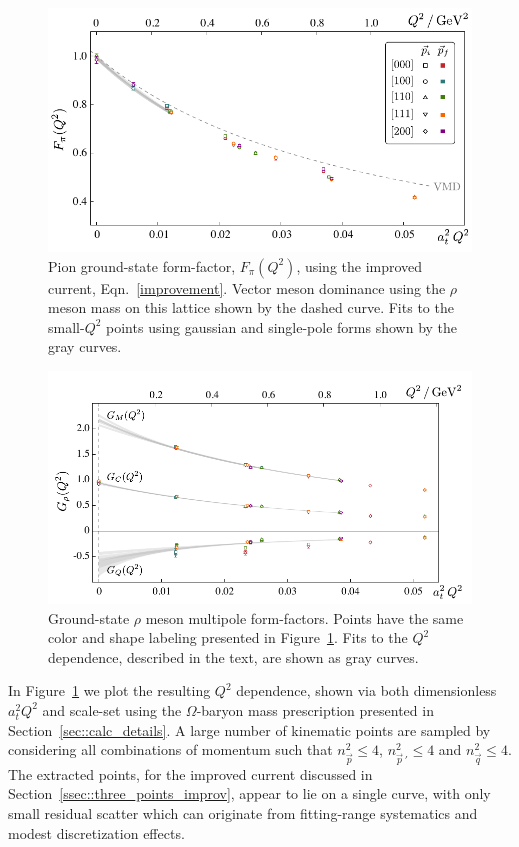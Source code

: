\documentclass[twocolumn,amsmath,amssymb,prd,10pt,floatfix, 
superscriptaddress,nofootinbib, showpacs, preprintnumbers]{revtex4-1}
\begin{document}
\begin{figure}
  \includegraphics[width=0.84\linewidth]{fig13.pdf}
  \caption{ Pion ground-state form-factor, $F_\pi(Q^2)$, using the improved current, Eqn.~\ref{improvement}. Vector meson dominance using the $\rho$ meson mass on this lattice shown by the dashed curve. Fits to the small-$Q^2$ points using gaussian and single-pole forms shown by the gray curves.
  \label{fig::pion_formfactor} }
\end{figure}



\begin{figure}
  \includegraphics[width=0.90\linewidth]{fig14.pdf}
  \caption{ Ground-state $\rho$ meson multipole form-factors. Points have the same color and shape labeling presented in Figure~\ref{fig::pion_formfactor}. Fits to the $Q^2$ dependence, described in the text, are shown as gray curves. 
 \label{fig::rho_form_factors}}
\end{figure}




In Figure~\ref{fig::pion_formfactor} we plot the resulting $Q^2$ dependence, shown via both dimensionless $a_t^2 Q^2$ and scale-set using the $\Omega$-baryon mass prescription presented in Section~\ref{sec::calc_details}. A large number of kinematic points are sampled by considering all combinations of momentum such that $n^2_{\vec{p}} \le 4$, $ n^2_{\vec{p}\,'} \le 4$ and $ n^2_{\vec{q}} \le 4$. The extracted points, for the improved current discussed in Section~\ref{ssec::three_points_improv}, appear to lie on a single curve, with only small residual scatter which can originate from fitting-range systematics and modest discretization effects.
\end{document}
